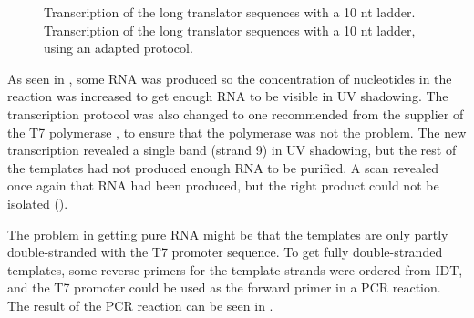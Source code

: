 \begin{figure}[h]
\begin{subfigure}[t]{0.49\textwidth}
  \caption{}
  \label{translator_transcription_long_2}
\end{subfigure}
\caption{ Transcription of the long translator sequences with a 10 nt ladder.  Transcription of the long translator sequences with a 10 nt ladder, using an adapted protocol.}
\end{figure}

As seen in , some RNA was produced so the concentration of nucleotides in the reaction was increased to get enough RNA to be visible in UV shadowing. The transcription protocol was also changed to one recommended from the supplier of the T7 polymerase \cite{nebtranscription}, to ensure that the polymerase was not the problem. The new transcription revealed a single band (strand 9) in UV shadowing, but the rest of the templates had not produced enough RNA to be purified. A scan revealed once again that RNA had been produced, but the right product could not be isolated ().

The problem in getting pure RNA might be that the templates are only partly double-stranded with the T7 promoter sequence. To get fully double-stranded templates, some reverse primers for the template strands were ordered from IDT, and the T7 promoter could be used as the forward primer in a PCR reaction. The result of the PCR reaction can be seen in .

